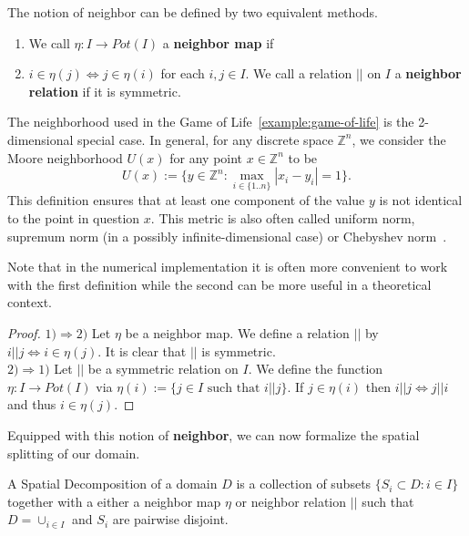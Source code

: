 \begin{definition}[Neighbor]
    The notion of neighbor can be defined by two equivalent methods.
    \begin{enumerate}
        \item We call $\eta:I\rightarrow Pot(I)$ a \textbf{neighbor map} if
        \item $i\in\eta(j) \Leftrightarrow j\in\eta(i)$ for each $i,j\in I$.
            We call a relation $||$ on $I$ a \textbf{neighbor relation} if it is symmetric.
    \end{enumerate}
\end{definition}

\begin{example}
    The neighborhood used in the Game of Life~\ref{example:game-of-life} is the 2-dimensional
    special case.
    In general, for any discrete space $\mathbb{Z}^n$, we consider the Moore neighborhood $U(x)$ for
    any point $x\in\mathbb{Z}^n$ to be
    \begin{equation}
        U(x) := \{y\in\mathbb{Z}^n:\max\limits_{i\in\{1..n\}}|x_i-y_i|=1\}.
    \end{equation}
    This definition ensures that at least one component of the value $y$ is not identical to the
    point in question $x$.
    This metric is also often called uniform norm, supremum norm (in a possibly infinite-dimensional
    case) or Chebyshev norm~\cite{Rudin1976}.
\end{example}

Note that in the numerical implementation it is often more convenient to work with the first
definition while the second can be more useful in a theoretical context.

\begin{proof}
    $1) \Rightarrow 2)$ Let $\eta$ be a neighbor map.
    We define a relation $||$ by $i||j \Leftrightarrow i\in\eta(j)$.
    It is clear that $||$ is symmetric.\\
    $2) \Rightarrow 1)$ Let $||$ be a symmetric relation on $I$.
    We define the function $\eta:I\rightarrow Pot(I)$ via
    $\eta(i):=\{j\in I \text{ such that } i||j\}$.
    If $j\in\eta(i)$ then $i||j \Leftrightarrow j||i$ and thus $i\in\eta(j)$.
\end{proof}

Equipped with this notion of \textbf{neighbor}, we can now formalize the spatial splitting of our
domain.

\begin{definition}
    A Spatial Decomposition of a domain $D$ is a collection of subsets
    $\{S_i\subset D: i\in I\}$ together with a either a neighbor map $\eta$ or neighbor relation
    $||$ such that $D=\cup_{i\in I}$ and $S_i$ are pairwise disjoint.
\end{definition}


